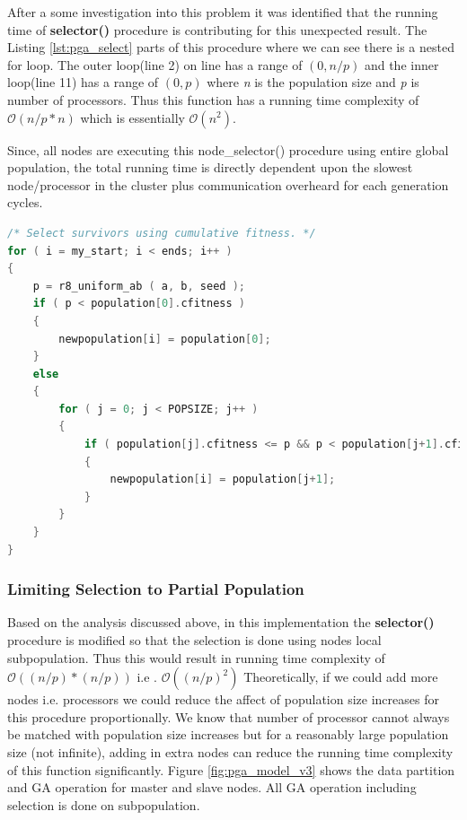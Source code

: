 After a some investigation into this problem it was identified that the running time of \textbf{selector()} procedure is contributing for this unexpected result. The Listing \ref{lst:pga_select} parts of this procedure where we can see there is a nested for loop. The outer loop(line 2) on line has a range of \textit{$(0, n/p)$} and the inner loop(line 11) has a range of  \textit{$(0, p)$} where  \textit{n} is the population size and \textit{p} is number of processors. Thus this function has a running time complexity of $\mathcal{O}(n/p * n)$ which is essentially $\mathcal{O}(n^2)$.

Since, all nodes are executing this node\_selector() procedure using entire global population, the total running time is directly dependent upon the slowest node/processor in the cluster plus communication overheard for each generation cycles.


\begin{lstlisting}[language=C, caption={node\_select() procedure.}, label={lst:pga_select}]
/* Select survivors using cumulative fitness. */ 
for ( i = my_start; i < ends; i++ )
{ 
    p = r8_uniform_ab ( a, b, seed );
    if ( p < population[0].cfitness )
    {
        newpopulation[i] = population[0];   
    }
    else
    {
        for ( j = 0; j < POPSIZE; j++ )
        {
            if ( population[j].cfitness <= p && p < population[j+1].cfitness )
            {
                newpopulation[i] = population[j+1];
            }
        }
    }
}
\end{lstlisting}


\subsubsection{Limiting Selection to Partial Population}
Based on the analysis discussed above, in this implementation the \textbf{selector()} procedure is modified so that the selection is done using nodes local subpopulation. Thus this would result in running time complexity of $\mathcal{O}((n/p) * (n/p))$ i.e . $\mathcal{O}((n/p)^2)$ Theoretically, if we could add more nodes i.e. processors we could reduce the affect of population size increases for this procedure proportionally. We know that number of processor cannot always be matched with population size increases but for a reasonably large population size (not infinite), adding in extra nodes can reduce the running time complexity of this function significantly. Figure \ref{fig:pga_model_v3} shows the data partition and GA operation for master and slave nodes. All GA operation including selection is done on subpopulation.

